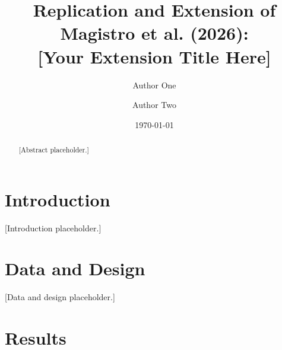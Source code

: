 \documentclass[12pt]{article}
\title{%
  Replication and Extension of Magistro et al. (2026):\\
  {[Your Extension Title Here]}
}
\author{
  Author One \and Author Two
}
\date{\today}
\begin{document}
\maketitle

\begin{abstract}
[Abstract placeholder.]
\end{abstract}

\newpage

\section{Introduction}
\label{sec:intro}


[Introduction placeholder.]

\section{Data and Design}
\label{sec:design}


[Data and design placeholder.]

\section{Results}
\label{sec:results}
\end{document}
